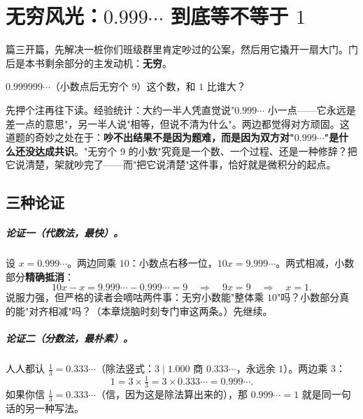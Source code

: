 \chapter{无穷风光：\texorpdfstring{$0.999\cdots$}{0.999...} 到底等不等于 \texorpdfstring{$1$}{1}}

篇三开篇，先解决一桩你们班级群里肯定吵过的公案，然后用它撬开一扇大门。门后是本书剩余部分的主发动机：\textbf{无穷}。

\begin{kaiwei}
$0.999999\cdots$（小数点后无穷个 $9$）这个数，和 $1$ 比谁大？
\end{kaiwei}

先押个注再往下读。经验统计：大约一半人凭直觉说"$0.999\cdots$ 小一点——它永远是差一点的意思"，另一半人说"相等，但说不清为什么"。两边都觉得对方顽固。这道题的奇妙之处在于：\textbf{吵不出结果不是因为题难，而是因为双方对"$0.999\cdots$"是什么还没达成共识}。"无穷个 9 的小数"究竟是一个数、一个过程、还是一种修辞？把它说清楚，架就吵完了——而"把它说清楚"这件事，恰好就是微积分的起点。

\section{三种论证}

\paragraph{论证一（代数法，最快）。}设 $x = 0.999\cdots$。两边同乘 $10$：小数点右移一位，$10x = 9.999\cdots$。两式相减，小数部分\textbf{精确抵消}：
\[
10x - x = 9.999\cdots - 0.999\cdots = 9 \quad\Longrightarrow\quad 9x = 9 \quad\Longrightarrow\quad x = 1 .
\]
说服力强，但严格的读者会嘀咕两件事：无穷小数能"整体乘 $10$"吗？小数部分真的能"对齐相减"吗？（本章烧脑时刻专门审这两条。）先继续。

\paragraph{论证二（分数法，最朴素）。}人人都认 $\tfrac13 = 0.333\cdots$（除法竖式：$3\mid 1.000$ 商 $0.333\cdots$，永远余 $1$）。两边乘 $3$：
\[
1 = 3\times\tfrac13 = 3\times 0.333\cdots = 0.999\cdots .
\]
如果你信 $\tfrac13 = 0.333\cdots$（信，因为这是除法算出来的），那 $0.999\cdots = 1$ 就是同一句话的另一种写法。

